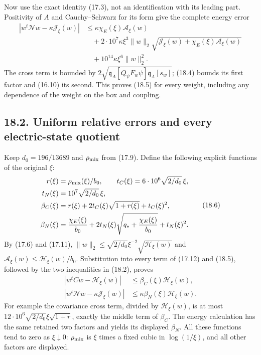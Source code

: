 \documentclass[
]{article}
\begin{document}
Now use the exact identity (17.3), not an identification with its
leading part. Positivity of \(A\) and Cauchy--Schwarz for its form give
the complete energy error \[
\begin{split}
|w^t\mathcal Nw-\kappa\mathcal J_\xi(w)|
&\le\kappa\chi_E(\xi)\mathcal A_\xi(w)\\
&\quad+2\cdot10^7\kappa\xi^3\|w\|_2
 \sqrt{\mathcal J_\xi(w)+\chi_E(\xi)\mathcal A_\xi(w)}\\
&\quad+10^{14}\kappa\xi^6\|w\|_2^2.
\end{split}                                                   \tag{18.5}
\] The cross term is bounded by
\(2\sqrt{\mathfrak q_A[Q_\psi F_w\psi]\mathfrak q_A[s_w]}\); (18.4)
bounds its first factor and (16.10) its second. This proves (18.5) for
every weight, including any dependence of the weight on the box and
coupling.

\subsection{18.2. Uniform relative errors and every electric-state
quotient}\label{uniform-relative-errors-and-every-electric-state-quotient}

Keep \(d_0=196/13689\) and \(\rho_{\rm mix}\) from (17.9). Define the
following explicit functions of the original \(\xi\): \[
\begin{split}
r(\xi)&=\rho_{\rm mix}(\xi)/b_0,\qquad
t_C(\xi)=6\cdot10^6\sqrt{2/d_0}\,\xi,\\
t_N(\xi)&=10^7\sqrt{2/d_0}\,\xi,\\
\beta_C(\xi)&=r(\xi)+2t_C(\xi)\sqrt{1+r(\xi)}+t_C(\xi)^2,\\
\beta_N(\xi)&=\frac{\chi_E(\xi)}{b_0}
 +2t_N(\xi)\sqrt{q_*+\frac{\chi_E(\xi)}{b_0}}+t_N(\xi)^2.
\end{split}                                                   \tag{18.6}
\] By (17.6) and (17.11),
\(\|w\|_2\le\sqrt{2/d_0}\xi^{-2}\sqrt{\mathcal H_\xi(w)}\) and
\(\mathcal A_\xi(w)\le\mathcal H_\xi(w)/b_0\). Substitution into every
term of (17.12) and (18.5), followed by the two inequalities in (18.2),
proves \[
\begin{split}
|w^tCw-\mathcal H_\xi(w)|
 &\le\beta_C(\xi)\mathcal H_\xi(w),\\
|w^t\mathcal Nw-\kappa\mathcal J_\xi(w)|
 &\le\kappa\beta_N(\xi)\mathcal H_\xi(w).
\end{split}                                                   \tag{18.7}
\] For example the covariance cross term, divided by
\(\mathcal H_\xi(w)\), is at most
\(12\cdot10^6\sqrt{2/d_0}\xi\sqrt{1+r}\), exactly the middle term of
\(\beta_C\). The energy calculation has the same retained two factors
and yields its displayed \(\beta_N\). All these functions tend to zero
as \(\xi\downarrow0\): \(\rho_{\rm mix}\) is \(\xi\) times a fixed cubic
in \(\log(1/\xi)\), and all other factors are displayed.
\end{document}
